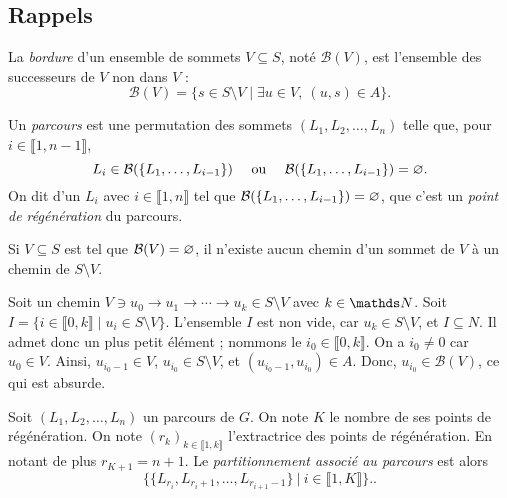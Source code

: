 \subsection{Rappels}

\begin{defn}
	La \textit{bordure} d'un ensemble de sommets $V \subseteq S$, noté $\mathcal{B}(V)$, est l'ensemble des successeurs de $V$\/ non dans $V$ : \[
		\mathcal{B}(V) = \{s \in S \setminus V   \mid \exists u \in V,\: (u,s) \in A\}
	.\]
\end{defn}

\begin{defn}[parcours]
	Un \textit{parcours} est une permutation des sommets $(L_1, L_2, \ldots, L_n)$\/ telle que, pour $i \in \llbracket 1,n -1\rrbracket$, \[
		L_i \in \mathcal{B}(\{L_1, \ldots, L_{i-1}\})\quad\text{ ou } \quad\mathcal{B}(\{L_1,\ldots,L_{i-1}\}) = \varnothing
	.\]
	On dit d'un $L_i$\/ avec $i \in \llbracket 1,n \rrbracket$\/ tel que $\mathcal{B}(\{L_1,\ldots,L_{i-1}\}) = \varnothing$, que c'est un \textit{point de régénération} du parcours.
\end{defn}

\begin{lem}
	Si $V \subseteq S$\/ est tel que $\mathcal{B}(V) = \varnothing$, il n'existe aucun chemin d'un sommet de $V$\/ à un chemin de $S \setminus V$.
\end{lem}

\begin{prv}
	Soit un chemin $V \owns u_0 \to u_1 \to \cdots \to u_k \in S \setminus V$\/ avec $k \in \N$. Soit $I = \{i \in \llbracket 0,k \rrbracket  \mid u_i \in S \setminus V\}$. L'ensemble $I$\/ est non vide, car $u_k \in S \setminus V$, et $I \subseteq N$. Il admet donc un plus petit élément ; nommons le $i_0 \in \llbracket 0,k \rrbracket$. On a $i_0 \neq 0$\/ car $u_0 \in V$. Ainsi, $u_{i_0 - 1} \in V$, $u_{i_0} \in S \setminus V$, et $(u_{i_0 - 1}, u_{i_0}) \in A$. Donc, $u_{i_0} \in \mathcal{B}(V)$, ce qui est absurde.
\end{prv}

\begin{defn}
	Soit $(L_1, L_2, \ldots, L_n)$\/ un parcours de $G$. On note $K$\/ le nombre de ses points de régénération. On note $(r_k)_{k \in \llbracket 1,k \rrbracket}$\/ l'extractrice des points de régénération. En notant de plus $r_{K+1} = n+1$.
	Le \textit{partitionnement associé au parcours} est alors \[
		\Big\{\{L_{r_i}, L_{r_i + 1}, \ldots, L_{r_{i+1} - 1}\} \:\Big|\: i \in \llbracket 1,K \rrbracket\Big\}.
	.\]
\end{defn}

